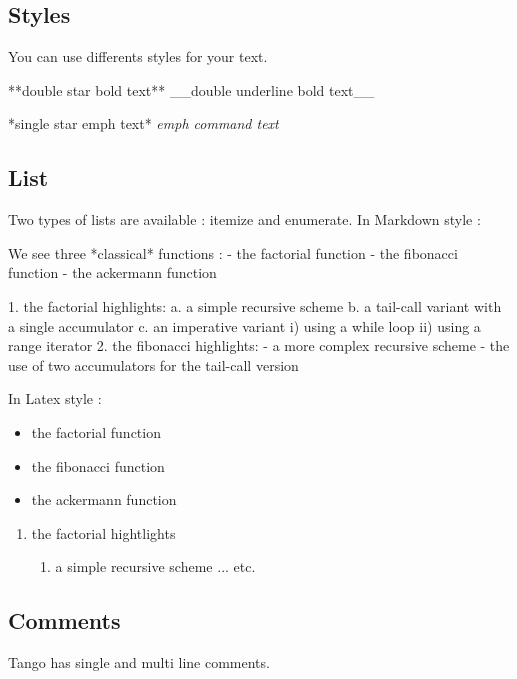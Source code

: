 \subsection{Styles}
You can use differents styles for your text.
\begin{code}[langague=tango]
  **double star bold text**
  __double underline bold text__

  *single star emph text*
  \emph{emph command text}
\end{code}

\subsection{List}
Two types of lists are available : itemize and enumerate.
In Markdown style :
\begin{code}[langague=tango]
  We see three *classical* functions : 
  - the factorial function 
  - the fibonacci function
  - the ackermann function

  1. the factorial highlights:
    a. a simple recursive scheme
    b. a tail-call variant with a single accumulator
    c. an imperative variant
      i) using a while loop
      ii) using a range iterator
  2. the fibonacci highlights:
    - a more complex recursive scheme
    - the use of two accumulators for the tail-call version 
\end{code}
In Latex style :
\begin{code}[langague=tango]
  \begin{itemize}
  \item the factorial function
  \item the fibonacci function
  \item the ackermann function
  \end{itemize}

  \begin{enumerate}
  \item the factorial hightlights
    \begin{enumerate}
    \item a simple recursive scheme
      ... etc.
    \end{enumerate}
  \end{enumerate}
\end{code}

\subsection{Comments}
Tango has single and multi line comments.

